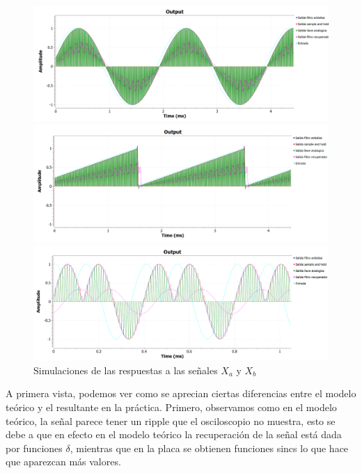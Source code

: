 \documentclass[../../ASSD_TP1_G7.tex]{subfiles}
\begin{document}
\begin{figure}[H]

\begin{centering}
\includegraphics[scale=0.5]{Imagenes/simulacion_llave_seno_a.PNG}
\par\end{centering}
\begin{centering}
\includegraphics[scale=0.5]{Imagenes/simulacion_llave_diente_a.PNG}
\par\end{centering}
\begin{centering}
\includegraphics[scale=0.5]{Imagenes/simulacion_llave_senoraro_a.PNG}\caption{Simulaciones de las respuestas a las señales $X_{a}$ y $X_{b}$ }
\par\end{centering}
\end{figure}

A primera vista, podemos ver como se aprecian ciertas diferencias
entre el modelo teórico y el resultante en la práctica. Primero, observamos
como en el modelo teórico, la señal parece tener un ripple que el
osciloscopio no muestra, esto se debe a que en efecto en el modelo
teórico la recuperación de la señal está dada por funciones $\delta$,
mientras que en la placa se obtienen funciones sincs lo que hace que
aparezcan más valores.
\end{document}

